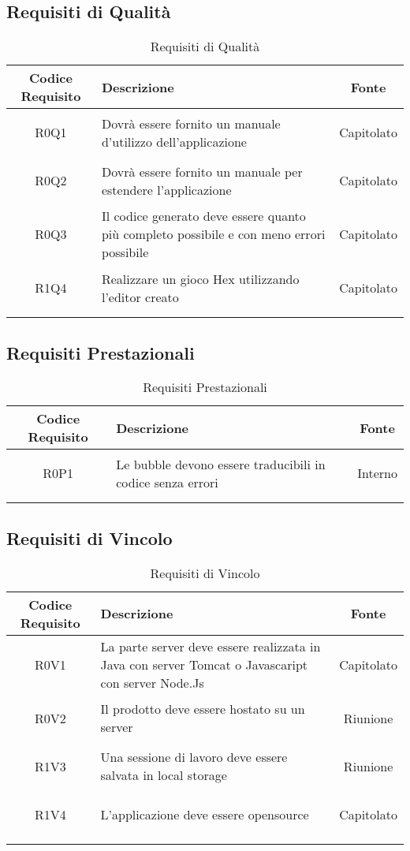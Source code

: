 \documentclass[../AnalisiDeiRequisiti.tex]{subfiles}
\begin{document}
\subsection{Requisiti di Qualità}
\normalsize
\begin{longtable}{|c|>{\centering}p{7cm}|c|}
	\hline
	\textbf{Codice Requisito} & \textbf{Descrizione} & \textbf{Fonte}\\
	\hline
	\endhead
	\hypertarget{R0Q1}{R0Q1} & Dovrà essere fornito un manuale d'utilizzo dell'applicazione & Capitolato \\ \hline
	\hypertarget{R0Q2}{R0Q2} & Dovrà essere fornito un manuale per estendere l'applicazione & Capitolato \\ \hline
	\hypertarget{R0Q3}{R0Q3} & Il codice generato deve essere quanto più completo possibile e con meno errori possibile & Capitolato \\ \hline
	\hypertarget{R1Q4}{R1Q4} & Realizzare un gioco Hex utilizzando l'editor creato & Capitolato \\ \hline
	\caption[Requisiti di Qualità]{Requisiti di Qualità}
	\label{tabella:req1}
\end{longtable}
\clearpage
\subsection{Requisiti Prestazionali}
\normalsize
\begin{longtable}{|c|>{\centering}p{7cm}|c|}
	\hline
	\textbf{Codice Requisito} & \textbf{Descrizione} & \textbf{Fonte}\\
	\hline
	\endhead
	\hypertarget{R0P1}{R0P1} & Le bubble devono essere traducibili in codice senza errori & Interno \\ \hline
	\caption[Requisiti Prestazionali]{Requisiti Prestazionali}
	\label{tabella:req2}
\end{longtable}
\clearpage
\subsection{Requisiti di Vincolo}
\normalsize
\begin{longtable}{|c|>{\centering}p{7cm}|c|}
	\hline
	\textbf{Codice Requisito} & \textbf{Descrizione} & \textbf{Fonte}\\
	\hline
	\endhead
	\hypertarget{R0V1}{R0V1} & La parte server deve essere realizzata in Java con server Tomcat o Javascaript con server Node.Js & Capitolato \\ \hline
	\hypertarget{R0V2}{R0V2} & Il prodotto deve essere hostato su un server & Riunione \\ \hline
	\hypertarget{R1V3}{R1V3} & Una sessione di lavoro deve essere salvata in local storage & Riunione \\ \hline
	\hypertarget{R1V4}{R1V4} & L'applicazione deve essere opensource
	& Capitolato \\ \hline
	\caption[Requisiti di Vincolo]{Requisiti di Vincolo}
	\label{tabella:req3}
\end{longtable}
\clearpage
\end{document}
